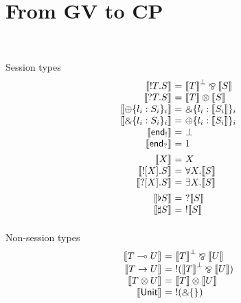 \documentclass{easychair}
\makeatletter
\newcommand{\ba}{\begin{array}}
\newcommand{\ea}{\end{array}}
\newenvironment{equations}{\[\ba{@{}r@{~}c@{~}l@{}}}{\ea\]}
\newcommand{\key}{\mathsf}
\newcommand{\set}[1]{\{ #1 \}}
\newcommand{\gvtocp}[1]{\llbracket{#1}\rrbracket}
\newcommand{\row}[2]{\set{#1}_{#2}}
\newcommand{\gvOutput}[2]{\mathord{!}{#1}.{#2}}
\newcommand{\gvInput}[2]{\mathord{?}{#1}.{#2}}
\newcommand{\gvEndOutput}{\key{end}_!}
\newcommand{\gvEndInput}{\key{end}_?}
\newcommand{\gvPlus}[2]{\oplus \row{#1}{#2}}
\newcommand{\gvChoice}[2]{\binampersand \row{#1}{#2}}
\newcommand{\gvServer}[1]{\flat {#1}}
\newcommand{\gvService}[1]{\sharp {#1}}
\newcommand{\gvDual}[1]{\overline{#1}}
\newcommand{\gvOutputType}[2]{![{#1}].{#2}}
\newcommand{\gvInputType}[2]{?[{#1}].{#2}}
\newcommand{\gvj}[3]{{#1} \vdash {#2} : {#3}}
\newcommand{\la}{l}
\newcommand{\lolli}{\multimap}
\newcommand{\gvLinFun}[2]{{#1} \lolli {#2}}
\newcommand{\gvUnFun}[2]{{#1} \to {#2}}
\newcommand{\gvTimes}[2]{{#1} \otimes {#2}}
\newcommand{\gvUnitType}{\key{Unit}}
\newcommand{\gvLink}[2]{\key{link}~{#1}~{#2}}
\newcommand{\gvReceiveType}[2]{\key{receiveType}~{#1}~{#2}}
\newcommand{\gvServeOld}[3]{\key{serve}~{#1}({#2})={#3}}
\newcommand{\gvRequest}[1]{\key{request}~{#1}}
\newcommand{\cpTimes}[2]{{#1} \otimes {#2}}
\newcommand{\cpPar}[2]{{#1} \mathbin{\bindnasrepma} {#2}}
\newcommand{\cpPlus}[2]{\oplus \row{#1}{#2}}
\newcommand{\cpWith}[2]{\binampersand \row{#1}{#2}}
\newcommand{\cpOne}{1}
\newcommand{\cpBottom}{\bot}
\newcommand{\cpOfCourse}[1]{!{#1}}
\newcommand{\cpWhyNot}[1]{?{#1}}
\newcommand{\cpDual}[1]{{#1}^\bot}
\newcommand{\cpExists}[2]{\exists {#1}.{#2}}
\newcommand{\cpForall}[2]{\forall {#1}.{#2}}
\newcommand{\FV}[1]{\mathit{FV}(#1)}
\makeatother
\begin{document}





\newpage

\section{From GV to CP}
~

Session types
\begin{equations}
\gvtocp{\gvOutput{T}{S}}        &=& \cpPar{\cpDual{\gvtocp{T}}}{\gvtocp{S}} \\
\gvtocp{\gvInput{T}{S}}         &=& \cpTimes{\gvtocp{T}}{\gvtocp{S}} \\
\gvtocp{\gvPlus{\la_i:S_i}{i}}   &=& \cpWith{\la_i:\gvtocp{S_i}}{i} \\
\gvtocp{\gvChoice{\la_i:S_i}{i}} &=& \cpPlus{\la_i:\gvtocp{S_i}}{i} \\
\gvtocp{\gvEndOutput}              &=& \cpBottom \\
\gvtocp{\gvEndInput}               &=& \cpOne \\[1ex]

\gvtocp{X}                       &=& X \\
\gvtocp{\gvOutputType{X}{S}}     &=& \cpForall{X}{\gvtocp{S}} \\
\gvtocp{\gvInputType{X}{S}}      &=& \cpExists{X}{\gvtocp{S}} \\[1ex]

\gvtocp{\gvServer{S}}  &=& \cpWhyNot{\gvtocp{S}} \\
\gvtocp{\gvService{S}} &=& \cpOfCourse{\gvtocp{S}} \\[1ex]
\end{equations}

Non-session types
\begin{equations}
\gvtocp{\gvLinFun{T}{U}} &=& \cpPar{\cpDual{\gvtocp{T}}}{\gvtocp{U}} \\
\gvtocp{\gvUnFun{T}{U}} &=& \cpOfCourse{(\cpPar{\cpDual{\gvtocp{T}}}{\gvtocp{U}})} \\
\gvtocp{\gvTimes{T}{U}} &=& \cpTimes{\gvtocp{T}}{\gvtocp{U}} \\
\gvtocp{\gvUnitType} &=& \cpOfCourse{(\cpWith{}{})} \\
\end{equations}
\end{document}
